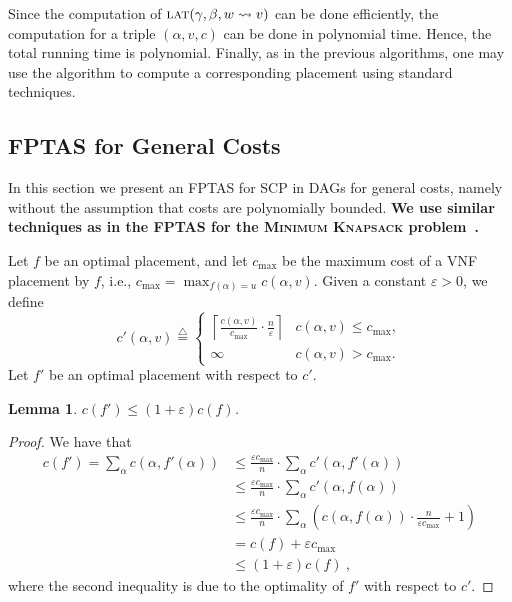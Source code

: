 \documentclass[11pt]{article}
\newcommand{\fix}[1]{{\color{purple}\textbf{#1}}}
\newtheorem{lemma}{Lemma}
\newcommand{\eqdf}{\stackrel{\scriptscriptstyle \triangle}{=}}
\newcommand{\paren}[1]{\left( #1 \right)}
\newcommand{\ceil}[1]{\left\lceil {#1} \right\rceil}
\newcommand{\eps}{\varepsilon}
\newcommand{\scp}{\textsc{SCP}\xspace}
\newcommand{\latency}{\textsc{lat}\xspace}
\begin{document}
Since the computation of $\latency(\gamma,\beta,w \leadsto v)$ can be
done efficiently, the computation for a triple $(\alpha,v,c)$ can be
done in polynomial time.  Hence, the total running time is polynomial.
Finally, as in the previous algorithms, one may use the algorithm to
compute a corresponding placement
using standard techniques.


\subsection{FPTAS for General Costs}
\label{sub:fptas}

In this section we present an FPTAS for \scp in DAGs for general
costs, namely without the assumption that costs are polynomially
bounded.  
\fix{
We use similar techniques as in the  FPTAS for the
\textsc{Minimum Knapsack} problem~\cite{islam2009approximation}.
}

Let $f$ be an optimal placement, and let $c_{\max}$ be the maximum
cost of a VNF placement by $f$, i.e., $c_{\max} = \max_{f(\alpha) =
  u} c(\alpha,v)$.
%
Given a constant $\eps>0$, we define
\[
c'(\alpha, v) \eqdf
\begin{cases}
\ceil{\frac{c(\alpha, v)}{c_{\max}} \cdot \frac{n}{\eps}}
       & c(\alpha, v) \leq c_{\max}, \\
\infty & c(\alpha, v) > c_{\max}.
\end{cases}
\]
Let $f'$ be an optimal placement with respect to $c'$.

\begin{lemma}
\label{lemma:guess}
$c(f') \leq (1+\eps)c(f)$.
\end{lemma}
\begin{proof}
We have that
\begin{align*}
c(f')
=    \sum_{\alpha} c(\alpha,f'(\alpha)) %
& \leq \frac{\eps c_{\max}}{n} \cdot \sum_{\alpha} c'(\alpha,f'(\alpha)) \\
& \leq \frac{\eps c_{\max}}{n} \cdot \sum_{\alpha} c'(\alpha,f(\alpha)) \\
& \leq \frac{\eps c_{\max}}{n} \cdot
     \sum_{\alpha}
       \paren{ c(\alpha,f(\alpha)) \cdot \frac{n}{\eps c_{\max}} + 1} \\
& =    c(f) + \eps c_{\max} \\
& \leq (1+\eps) c(f)
~,
\end{align*}
where the second inequality is due to the optimality of $f'$ with
respect to $c'$.
\end{proof}
\end{document}
